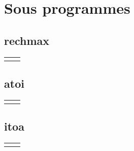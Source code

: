 \documentclass[12pt,a4paper,openany]{book}
\begin{document}
\chapter{Sous programmes}
\section{rechmax}
\begin{tabular}{p{6cm}p{6cm}}

	&

\end{tabular}
\section{atoi}
\begin{tabular}{p{6cm}p{6cm}}

	&

\end{tabular}
\section{itoa}
\begin{tabular}{p{6cm}p{6cm}}

	&

\end{tabular}
\appendix
\end{document}
